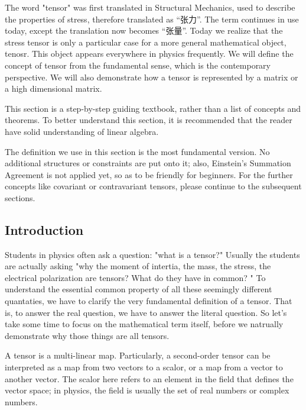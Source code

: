 

The word "tensor" was first translated in Structural Mechanics, used to describe the properties of stress, therefore translated as “张力”. The term continues in use today, except the translation now becomes “张量”. Today we realize that the stress tensor is only a particular case for a more general mathematical object, tenosr. This object appears everywhere in physics frequently. We will define the concept of tensor from the fundamental sense, which is the contemporary perspective. We will also demonstrate how a tensor is represented by a matrix or a high dimensional matrix. 

This section is a step-by-step guiding textbook, rather than a list of concepts and theorems. To better understand this section, it is recommended that the reader have solid understanding of linear algebra. 

The definition we use in this section is the most fundamental version. No additional structures or constraints are put onto it; also, Einstein's Summation Agreement is not applied yet, so as to be friendly for beginners. For the further concepts like covariant or contravariant tensors, please continue to the subsequent sections. 



\subsection{Introduction}

Students in physics often ask a question: "what is a tensor?" Usually the students are actually asking "why the moment of intertia, the mass, the stress, the electrical polarization are tensors? What do they have in common? " To understand the essential common property of all these seemingly different quantaties, we have to clarify the very fundamental definition of a tensor. That is, to answer the real question, we have to answer the literal question. So let's take some time to focus on the mathematical term itself, before we natrually demonstrate why those things are all tensors. 

A tensor is a multi-linear map. Particularly, a second-order tensor can be interpreted as a map from two vectors to a scalor, or a map from a vector to another vector. The scalor here refers to an element in the field that defines the vector space; in physics, the field is usually the set of real numbers or complex numbers. 

